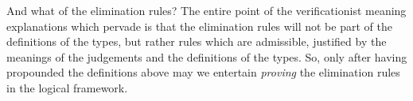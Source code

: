 \documentclass[acmtoplas]{acmtrans2m}
\begin{document}
And what of the elimination rules? The entire point of the verificationist
meaning explanations which pervade \cite{Martin-Lof-1979} is that the
elimination rules will not be part of the definitions of the types, but rather
rules which are admissible, justified by the meanings of the judgements and the
definitions of the types. So, only after having propounded the definitions
above may we entertain \emph{proving} the elimination rules in the logical
framework.

\bigskip


\nocite{*}

\end{document}

